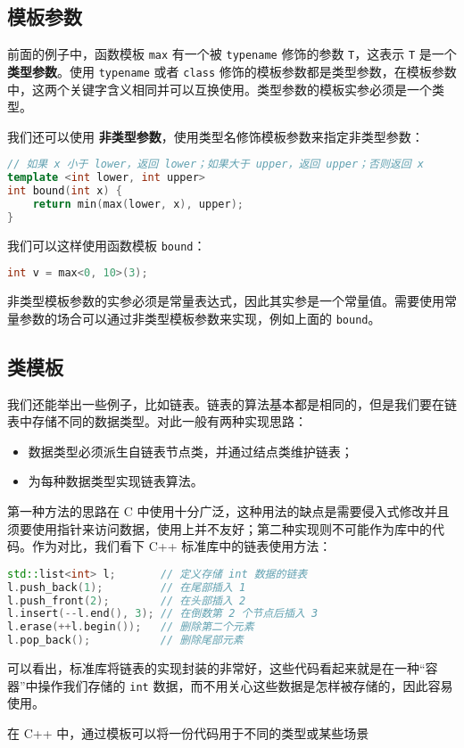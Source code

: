 \subsection{模板参数}

前面的例子中，函数模板 \texttt{max} 有一个被 \texttt{typename} 修饰的参数 \texttt{T}，这表示 \texttt{T} 是一个\textbf{类型参数}。使用 \texttt{typename} 或者 \texttt{class} 修饰的模板参数都是类型参数，在模板参数中，这两个关键字含义相同并可以互换使用。类型参数的模板实参必须是一个类型。

我们还可以使用 \textbf{非类型参数}，使用类型名修饰模板参数来指定非类型参数：
\begin{lstlisting}[language=c++]
// 如果 x 小于 lower，返回 lower；如果大于 upper，返回 upper；否则返回 x
template <int lower, int upper>
int bound(int x) {
    return min(max(lower, x), upper);
}
\end{lstlisting}
我们可以这样使用函数模板 \texttt{bound}：
\begin{lstlisting}[language=c++,numbers=none]
int v = max<0, 10>(3);
\end{lstlisting}
非类型模板参数的实参必须是常量表达式，因此其实参是一个常量值。需要使用常量参数的场合可以通过非类型模板参数来实现，例如上面的 \texttt{bound}。

\subsection{类模板}


我们还能举出一些例子，比如链表。链表的算法基本都是相同的，但是我们要在链表中存储不同的数据类型。对此一般有两种实现思路：
\begin{itemize}
  \item 数据类型必须派生自链表节点类，并通过结点类维护链表；
  \item 为每种数据类型实现链表算法。
\end{itemize}
第一种方法的思路在 C 中使用十分广泛，这种用法的缺点是需要侵入式修改并且须要使用指针来访问数据，使用上并不友好；第二种实现则不可能作为库中的代码。作为对比，我们看下 C++ 标准库中的链表使用方法：
\begin{lstlisting}[language=c++]
std::list<int> l;       // 定义存储 int 数据的链表
l.push_back(1);         // 在尾部插入 1
l.push_front(2);        // 在头部插入 2
l.insert(--l.end(), 3); // 在倒数第 2 个节点后插入 3
l.erase(++l.begin());   // 删除第二个元素
l.pop_back();           // 删除尾部元素
\end{lstlisting}
可以看出，标准库将链表的实现封装的非常好，这些代码看起来就是在一种``容器''中操作我们存储的 \texttt{int} 数据，而不用关心这些数据是怎样被存储的，因此容易使用。

在 C++ 中，通过模板可以将一份代码用于不同的类型或某些场景
